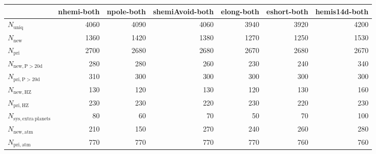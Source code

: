 \begin{tabular}{lrrrrrr}
\toprule
{} &  nhemi-both &  npole-both &  shemiAvoid-both &  elong-both &  eshort-both &  hemis14d-both \\
\midrule
$N_{\mathrm{uniq}}$               &        4060 &        4090 &             4060 &        3940 &         3920 &           4200 \\
$N_{\mathrm{new}}$                &        1360 &        1420 &             1380 &        1270 &         1250 &           1530 \\
$N_{\mathrm{pri}}$                &        2700 &        2680 &             2680 &        2670 &         2680 &           2670 \\
$N_{\mathrm{new,P>20d}}$          &         280 &         280 &              260 &         230 &          240 &            340 \\
$N_{\mathrm{pri,P>20d}}$          &         310 &         300 &              300 &         300 &          300 &            300 \\
$N_{\mathrm{new,HZ}}$             &         130 &         120 &              130 &         120 &          130 &            160 \\
$N_{\mathrm{pri,HZ}}$             &         230 &         230 &              220 &         230 &          220 &            230 \\
$N_{\mathrm{sys,extra\ planets}}$ &          80 &          60 &               70 &          50 &           70 &            100 \\
$N_{\mathrm{new,atm}}$            &         210 &         150 &              270 &         240 &          260 &            280 \\
$N_{\mathrm{pri,atm}}$            &         770 &         770 &              770 &         770 &          760 &            760 \\
\bottomrule
\end{tabular}
